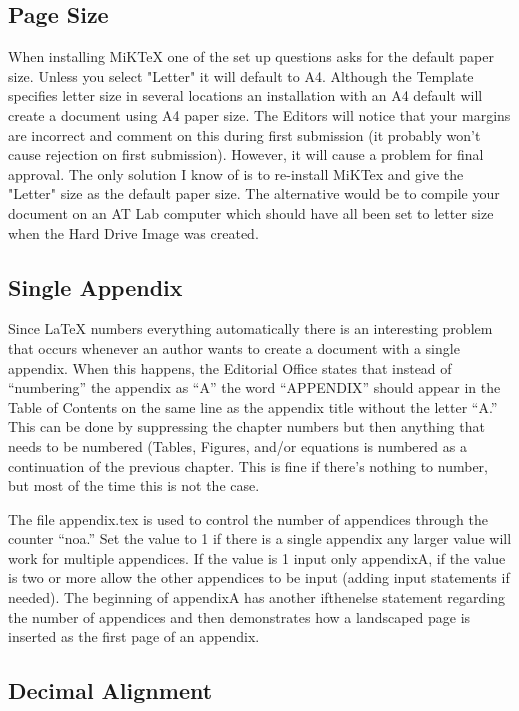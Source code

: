 \subsection{Page Size}

When installing MiKTeX one of the set up questions asks for the default paper size. Unless you select "Letter" it will default to A4. Although the Template specifies letter size in several locations an installation with an A4 default will create a document using A4 paper size. The Editors will notice that your margins are incorrect and comment on this during first submission (it probably won't cause rejection on first submission). However, it will cause a problem for final approval. The only solution I know of is to re-install MiKTex and give the "Letter" size as the default paper size. The alternative would be to compile your document on an AT Lab computer which should have all been set to letter size when the Hard Drive Image was created.

\subsection{Single Appendix}

Since LaTeX numbers everything automatically there is an interesting problem that occurs whenever an author wants to create a document with a single appendix. When this happens, the Editorial Office states that instead of ``numbering'' the appendix as ``A'' the word ``APPENDIX'' should appear in the Table of Contents on the same line as the appendix title without the letter ``A.'' This can be done by suppressing the chapter numbers but then anything that needs to be numbered (Tables, Figures, and/or equations is numbered as a continuation of the previous chapter. This is fine if there's nothing to number, but most of the time this is not the case.

The file appendix.tex is used to control the number of appendices through the counter ``noa.'' Set the value to 1 if there is a single appendix any larger value will work for multiple appendices. If the value is 1 input only appendixA, if the value is two or more allow the other appendices to be input (adding input statements if needed). The beginning of appendixA has another ifthenelse statement regarding the number of appendices and then demonstrates how a landscaped page is inserted as the first page of an appendix. \citep{vanBruggen98}

\subsection{Decimal Alignment}


